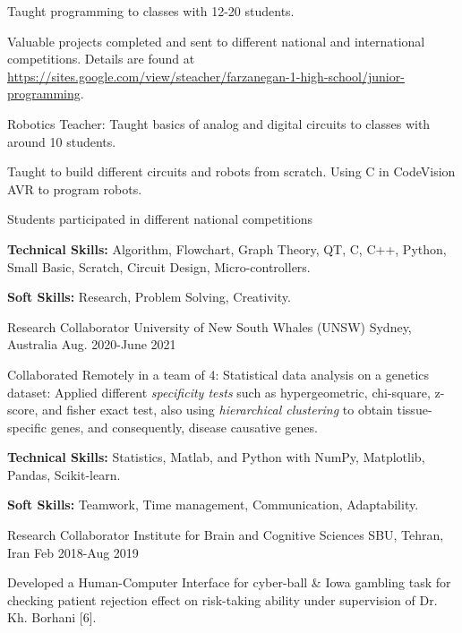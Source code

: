\begin{cventries}
{\begin{cvitems}
          {Taught programming to classes with 12-20 students.}
          \item{Valuable projects completed and sent to different national and international competitions. Details are found at \href{https://sites.google.com/view/steacher/farzanegan-1-high-school/junior-programming}{https://sites.google.com/view/steacher/farzanegan-1-high-school/junior-programming}.}
        \item{Robotics Teacher:}
          {Taught basics of analog and digital circuits to classes with around 10 students.}
          \item{Taught to build different circuits and robots from scratch. Using C in CodeVision AVR to program robots.}
          \item{Students participated in different national competitions}
        \item {\textbf{Technical Skills:} Algorithm, Flowchart, Graph Theory, QT, C, C++, Python, Small Basic, Scratch, Circuit Design, Micro-controllers.}
        \item {\textbf{Soft Skills:} Research, Problem Solving, Creativity.}
      \end{cvitems}
    }
    
  \cventry
{Research Collaborator}  %
    {University of New South Whales (UNSW)} %
    {Sydney, Australia} %
    {Aug. 2020-June 2021} %
    {
      \begin{cvitems} %
        \item{Collaborated Remotely in a team of 4: Statistical data analysis on a genetics dataset: Applied different \textit{specificity tests} such as hypergeometric, chi-square, z-score, and fisher exact test, also using \textit{hierarchical clustering} to obtain tissue-specific genes, and consequently, disease causative genes.}
        \item {\textbf{Technical Skills:} Statistics, Matlab, and Python with NumPy, Matplotlib, Pandas, Scikit-learn.}
        \item {\textbf{Soft Skills:} Teamwork, Time management, Communication, Adaptability.}
      \end{cvitems}
    }
 
  \cventry
    {Research Collaborator}  %
    {Institute for Brain and Cognitive Sciences} %
    {SBU, Tehran, Iran} %
    {Feb 2018-Aug 2019} %
    {
      \begin{cvitems} %
        \item{Developed a Human-Computer Interface for cyber-ball \& Iowa gambling task for checking patient rejection effect on risk-taking ability under supervision of Dr. Kh. Borhani [6].}
      \end{cvitems}
    }


\end{cventries}
